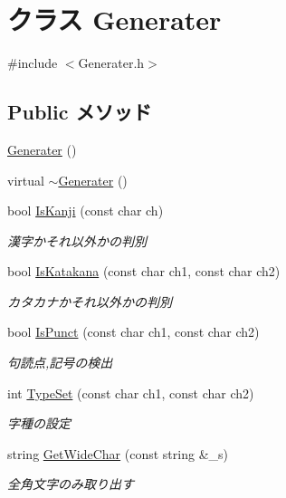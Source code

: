 \hypertarget{class_generater}{\section{クラス Generater}
\label{class_generater}
}


{\ttfamily \#include $<$Generater.\-h$>$}

\subsection*{Public メソッド}
\begin{DoxyCompactItemize}
\item 
\hyperlink{class_generater_ae49a61b5d0ea6cfe547f79bb5f074a2d}{Generater} ()
\item 
virtual \hyperlink{class_generater_ac457e81b728164f877d83f43c91015a9}{$\sim$\-Generater} ()
\item 
bool \hyperlink{class_generater_a5e5b60f2b99bb3c3a3ecdbf1f89bf5bd}{Is\-Kanji} (const char ch)
\begin{DoxyCompactList}\small\item\em 漢字かそれ以外かの判別 \end{DoxyCompactList}\item 
bool \hyperlink{class_generater_a6f9bf9dd332499606ed18a32a9685738}{Is\-Katakana} (const char ch1, const char ch2)
\begin{DoxyCompactList}\small\item\em カタカナかそれ以外かの判別 \end{DoxyCompactList}\item 
bool \hyperlink{class_generater_a0d033a9c1042e11089283ae46fcb6dbd}{Is\-Punct} (const char ch1, const char ch2)
\begin{DoxyCompactList}\small\item\em 句読点,記号の検出 \end{DoxyCompactList}\item 
int \hyperlink{class_generater_af3b5d4bd16fe1046a925c0d561324156}{Type\-Set} (const char ch1, const char ch2)
\begin{DoxyCompactList}\small\item\em 字種の設定 \end{DoxyCompactList}\item 
string \hyperlink{class_generater_a67589e43b9db3162ff6e316c679b910c}{Get\-Wide\-Char} (const string \&\-\_\-s)
\begin{DoxyCompactList}\small\item\em 全角文字のみ取り出す \end{DoxyCompactList}\item 

\end{DoxyCompactItemize}
